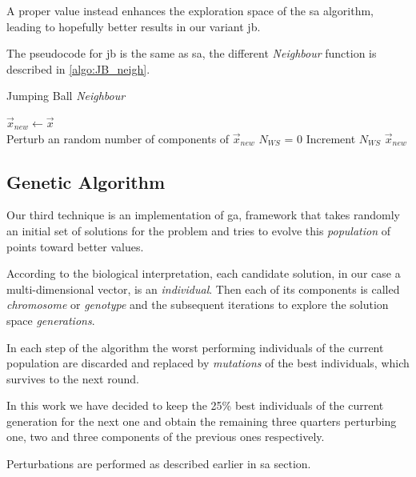 \documentclass[journal]{IEEEtran}
\begin{document}
A proper value instead enhances the exploration space of the \gls{sa} algorithm, leading to hopefully better results in our variant \gls{jb}.

The pseudocode for \gls{jb} is the same as \gls{sa}, the different \emph{Neighbour} function is described in \autoref{algo:JB_neigh}.

\begin{algorithm}
	\caption{Jumping Ball \emph{Neighbour}}\label{algo:JB_neigh}
	 {
		$\vec{x}_{new} \gets \vec{x}$ \\
		 {
			 {
				Perturb an random number of components of $\vec{x}_{new}$
			}
			$N_{WS}$ = 0
		}
	}
	 {
		Increment $N_{WS}$
	}
	\Return $\vec{x}_{new}$
\end{algorithm}

\subsection{Genetic Algorithm}

Our third technique is an implementation of \gls{ga}, framework that takes randomly an initial set of solutions for the problem and tries to evolve this \emph{population} of points toward better values.

According to the biological interpretation, each candidate solution, in our case a multi-dimensional vector, is an \emph{individual}.
Then each of its components is called \emph{chromosome} or \emph{genotype} and the subsequent iterations to explore the solution space \emph{generations}.

In each step of the algorithm the worst performing individuals of the current population are discarded and replaced by \emph{mutations} of the best individuals, which survives to the next round.

In this work we have decided to keep the 25\% best individuals of the current generation for the next one and obtain the remaining three quarters perturbing one, two and three components of the previous ones respectively.

Perturbations are performed as described earlier in \gls{sa} section.
\end{document}
